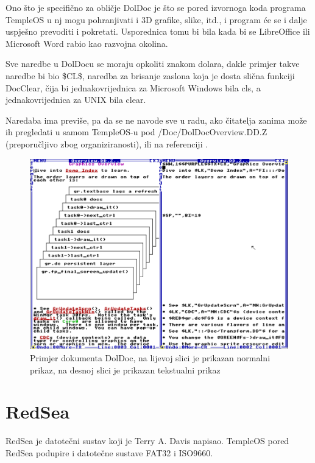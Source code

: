 \documentclass{foi}
\begin{document}
Ono što je specifično za obličje DolDoc je što se pored izvornoga koda programa TempleOS u nj mogu pohranjivati i 3D grafike, slike, itd., i program će se i dalje uspješno prevoditi i pokretati. Usporednica tomu bi bila kada bi se LibreOffice ili Microsoft Word rabio kao razvojna okolina.

Sve naredbe u DolDocu se moraju opkoliti znakom dolara, dakle primjer takve naredbe bi bio {\selectfont \$CL\$}, naredba za brisanje zaslona koja je dosta slična funkciji {\selectfont DocClear}, čija bi jednakovrijednica za Microsoft Windows bila {\selectfont cls}, a jednakovrijednica za UNIX bila {\selectfont clear}.

Naredaba ima previše, pa da se ne navode sve u radu, ako čitatelja zanima može ih pregledati u samom TempleOS-u pod {\selectfont /Doc/DolDocOverview.DD.Z} (preporučljivo zbog organiziranosti), ili na referenciji \cite{DolDoc}.

\begin{figure}[H]
    \centering
    \includegraphics[width=1.0\textwidth]{slike/doldoc.png}
	\captionsetup{justification=centering}
    \caption{Primjer dokumenta DolDoc, na lijevoj slici je prikazan normalni prikaz, na desnoj slici je prikazan tekstualni prikaz}
    \label{fig:doldoc}
\end{figure}

\section{RedSea}

RedSea je datotečni sustav koji je Terry A. Davis napisao. TempleOS pored RedSea podupire i datotečne sustave FAT32 i ISO9660.
\end{document}
